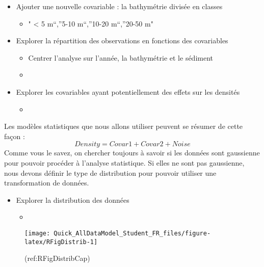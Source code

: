 \documentclass[french,a4paper]{article}
\providecommand{\tightlist}{%
  \setlength{\itemsep}{0pt}\setlength{\parskip}{0pt}}
\begin{document}
\begin{itemize}
\tightlist
\item
  Ajouter une nouvelle covariable : la bathymétrie divisée en classes

  \begin{itemize}
  \tightlist
  \item
    " \textless{} 5 m``,''5-10 m``,''10-20 m``,''20-50 m"
  \end{itemize}
\item
  Explorer la répartition des observations en fonctions des covariables

  \begin{itemize}
  \item
    Centrer l'analyse sur l'année, la bathymétrie et le sédiment
  \item
  \end{itemize}
\item
  Explorer les covariables ayant potentiellement des effets sur les
  densités

  \begin{itemize}
  \item
  \end{itemize}
\end{itemize}

Les modèles statistiques que nous allons utiliser peuvent se résumer de
cette façon : \[Density = Covar1 + Covar2 + Noise\] Comme vous le savez,
on chercher toujours à savoir si les données sont gaussienne pour
pouvoir procéder à l'analyse statistique. Si elles ne sont pas
gaussienne, nous devons définir le type de distribution pour pouvoir
utiliser une transformation de données.

\begin{itemize}
\tightlist
\item
  Explorer la distribution des données

  \begin{itemize}
  \item
  \end{itemize}
\end{itemize}

\begin{figure}[!h]

{\centering \texttt{[image: Quick\_AllDataModel\_Student\_FR\_files/figure-latex/RFigDistrib-1]} 

}

\caption{(ref:RFigDistribCap)}\label{fig:RFigDistrib}
\end{figure}
\end{document}
